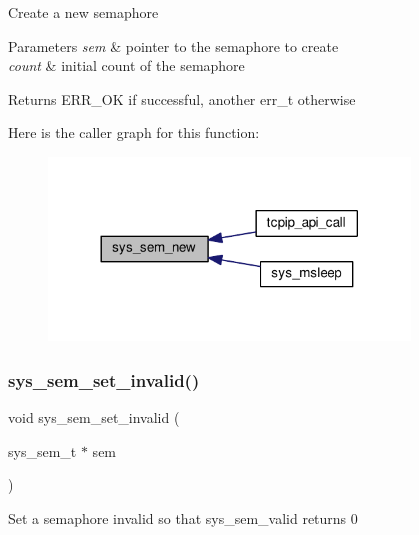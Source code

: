 Create a new semaphore 
\begin{DoxyParams}{Parameters}
{\em sem} & pointer to the semaphore to create \\
\hline
{\em count} & initial count of the semaphore \\
\hline
\end{DoxyParams}
\begin{DoxyReturn}{Returns}
E\+R\+R\+\_\+\+OK if successful, another err\+\_\+t otherwise 
\end{DoxyReturn}
Here is the caller graph for this function\+:
\nopagebreak
\begin{figure}[H]
\begin{center}
\leavevmode
\includegraphics[width=272pt]{group__sys__sem_gaf99da9e34a71855285c535183133dfde_icgraph}
\end{center}
\end{figure}
\mbox{\label{group__sys__sem_ga42a2ab32afbf41a4146a9d135224ef33}} 
\subsubsection{\texorpdfstring{sys\+\_\+sem\+\_\+set\+\_\+invalid()}{sys\_sem\_set\_invalid()}}
{\footnotesize\ttfamily void sys\+\_\+sem\+\_\+set\+\_\+invalid (\begin{DoxyParamCaption}\item[{sys\+\_\+sem\+\_\+t $\ast$}]{sem }\end{DoxyParamCaption})}

Set a semaphore invalid so that sys\+\_\+sem\+\_\+valid returns 0 \mbox{\label{group__sys__sem_gaaf800273061fcc3f8200fd4e1b9ca875}} 
